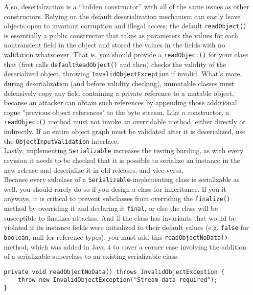 \documentclass[8pt, table, xcdraw]{article}%
\begin{document}
Also, deserialization is a “hidden constructor” with all of the same issues as other constructors. Relying on the default deserialization mechanism can easily leave objects open to invariant corruption and illegal access; the default \lstinline{readObject()} is essentially a public constructor that takes as parameters the values for each nontransient field in the object and stored the values in the fields with no validation whatsoever. That is, you should provide a \lstinline{readObject()} for your class that (first calls \lstinline{defaultReadObject()} and then) checks the validity of the deserialized object, throwing \lstinline{InvalidObjectException} if invalid. What's more, during deserialization (and before validity checking), immutable classes must defensively copy any field containing a private reference to a mutable object, because an attacker can obtain such references by appending those additional rogue "previous object references" to the byte stream. Like a constructor, a \lstinline{readObject()} method must not invoke an overridable method, either directly or indirectly. If an entire object graph must be validated after it is deserialized, use the \lstinline{ObjectInputValidation} interface.\\
Lastly, implementing \lstinline{Serializable} increases the testing burding, as with every revision it needs to be checked that it is possible to serialize an instance in the new release and deserialize it in old releases, and vice versa.\\
Because every subclass of a \lstinline{Serializable}-implementing class is serializable as well, you should rarely do so if you design a class for inheritance. If you it anyways, it is critical to prevent subclasses from overriding the \lstinline{finalize()} method by overriding it and declaring it \lstinline{final}, or else the class will be susceptible to finalizer attackss. And if the class has invariants that would be violated if its instance fields were initialized to their default values (e.g. \lstinline{false} for \lstinline{boolean}, null for reference types), you must add this \lstinline{readObjectNoData()} method, which was added in Java 4 to cover a corner case involving the addition of a serializable superclass to an existing serializable class:

\begin{lstlisting}
private void readObjectNoData() throws InvalidObjectException {
    throw new InvalidObjectException("Stream data required");
}
\end{lstlisting}
\end{document}
